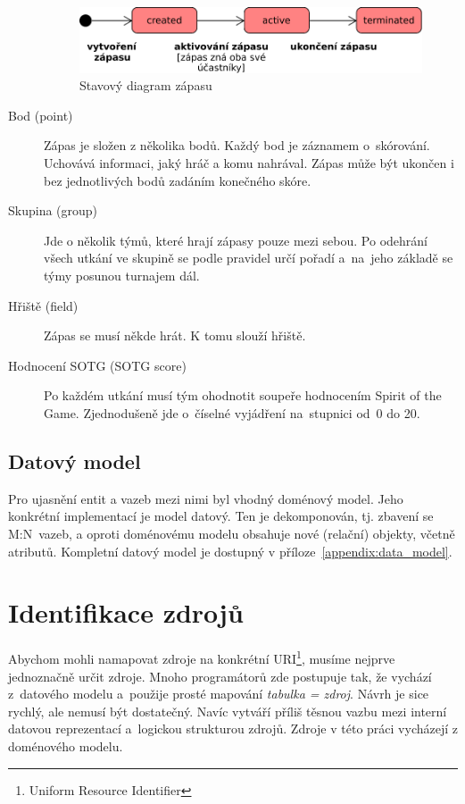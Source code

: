 \begin{description}
\begin{figure}[ht!]
      \centering
      \includegraphics[width=110mm]{./images/stavovy-diagram-zapas.pdf}
      \caption{Stavový diagram zápasu\label{overflow}}
      \label{fig:state_match}
    \end{figure}
  \item[Bod (point)]
    Zápas je složen z několika bodů. Každý bod je záznamem o~skórování. Uchovává informaci, jaký hráč a komu nahrával.
    Zápas může být ukončen i bez jednotlivých bodů zadáním konečného skóre.
  \item[Skupina (group)]
    Jde o několik týmů, které hrají zápasy pouze mezi sebou. Po odehrání všech utkání ve skupině se podle pravidel určí pořadí a~na~jeho základě se týmy posunou turnajem dál.
  \item[Hřiště (field)]
    Zápas se musí někde hrát. K tomu slouží hřiště.
  \item[Hodnocení SOTG (SOTG score)]
    Po každém utkání musí tým ohodnotit soupeře hodnocením Spirit of the Game. Zjednodušeně jde o~číselné vyjádření na~stupnici od~0 do 20.
\end{description}

\subsection{Datový model}

Pro ujasnění entit a vazeb mezi nimi byl vhodný doménový model. Jeho konkrétní implementací je model datový.
Ten je dekomponován, tj. zbavení se M:N~vazeb, a oproti doménovému modelu obsahuje nové
(relační) objekty, včetně atributů. Kompletní datový model je dostupný v příloze~\ref{appendix:data_model}.

\section{Identifikace zdrojů}

Abychom mohli namapovat zdroje na konkrétní URI\footnote{Uniform Resource Identifier},
musíme nejprve jedno\-značně určit zdroje. Mnoho programátorů zde postupuje tak, že vychází
z~datového modelu a~použije prosté mapování \textit{tabulka = zdroj}.
Návrh je sice rychlý, ale nemusí být dostatečný. Navíc vytváří příliš těsnou vazbu mezi interní datovou reprezentací
a~logickou strukturou zdrojů. Zdroje v této práci vycházejí z doménového modelu.

